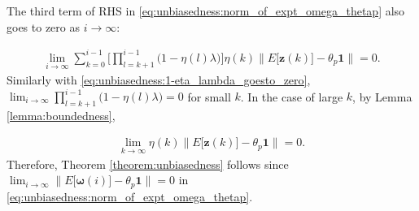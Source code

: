 \documentclass[journal]{IEEEtran}
\begin{document}
{}{
The third term of RHS in \eqref{eq:unbiasedness:norm_of_expt_omega_thetap} also goes to zero as $i \to \infty$:}

\vspace{-4mm}
\small
\begin{align}
\lim_{i \to \infty} \sum_{k=0}^{i-1}\Bigg[\prod_{l=k+1}^{i-1} \Big(1 - \eta(l)\lambda \Big)\Bigg]  \eta(k) \Big\| E\big[\mathbf{z}(k)\big] - \theta_p\mathbf{1}\Big\| = 0. \label{eq:appendix:3rd_term}
\end{align}
\normalsize
Similarly with \eqref{eq:unbiasedness:1-eta_lambda_goesto_zero}, $\lim_{i \to \infty} \prod_{l=k+1}^{i-1} \Big(1 - \eta(l)\lambda \Big) = 0$ for small $k$. In the case of large $k$, by Lemma \ref{lemma:boundedness},

\vspace{-4mm}
\small
\begin{align}
\lim_{k \to \infty} \eta(k) \Big\| E\big[\mathbf{z}(k)\big] - \theta_p\mathbf{1} \Big\| = 0.
\end{align} 
\normalsize
{}{Therefore, Theorem \ref{theorem:unbiasedness} follows since \small $\lim_{i \to \infty} \Big\|E\big[\bm{\omega}(i)\big] - \theta_p \mathbf{1} \Big\| = 0$ \normalsize in \eqref{eq:unbiasedness:norm_of_expt_omega_thetap}.}
\vspace{-3mm}
\end{document}
